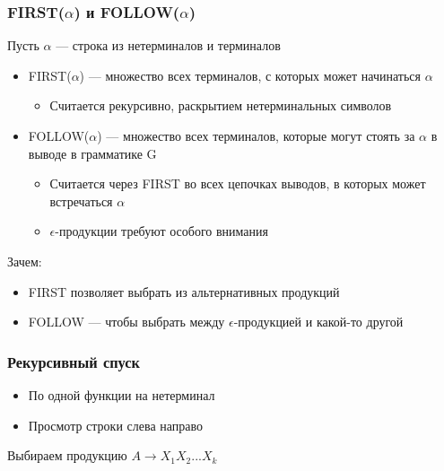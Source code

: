\documentclass[xetex,mathserif,serif]{beamer}
\begin{document}
    \begin{frame}
        \frametitle{FIRST($\alpha$) и FOLLOW($\alpha$)}
        Пусть $\alpha$ --- строка из нетерминалов и терминалов
        \begin{itemize}
            \item FIRST($\alpha$) --- множество всех терминалов, с которых может начинаться $\alpha$
            \begin{itemize}
                \item Считается рекурсивно, раскрытием нетерминальных символов
            \end{itemize}
            \item FOLLOW($\alpha$) --- множество всех терминалов, которые могут стоять за $\alpha$ в выводе в грамматике G
            \begin{itemize}
                \item Считается через FIRST во всех цепочках выводов, в которых может встречаться $\alpha$
                \item $\epsilon$-продукции требуют особого внимания
            \end{itemize}
        \end{itemize}
        Зачем:
        \begin{itemize}
            \item FIRST позволяет выбрать из альтернативных продукций
            \item FOLLOW --- чтобы выбрать между $\epsilon$-продукцией и какой-то другой
        \end{itemize}
    \end{frame}

    \begin{frame}[fragile]
        \frametitle{Рекурсивный спуск}
        \begin{itemize}
            \item По одной функции на нетерминал
            \item Просмотр строки слева направо
        \end{itemize}

        \begin{algorithm}[H]
            Выбираем продукцию $A \rightarrow X_1X_2...X_k$\;
        \end{algorithm}
    \end{frame}
\end{document}
